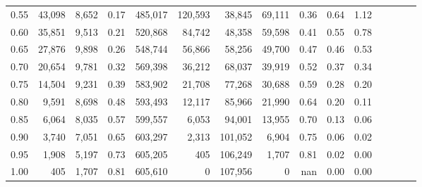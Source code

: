 \begin{tabular}{rrrcrrrrrrrrrrr}
0.55 &  43,098 &  8,652 &                                       0.17 &  485,017 &  120,593 &   38,845 &   69,111 &  0.36 &  0.64 &                         1.12 \\
0.60 &  35,851 &  9,513 &                                       0.21 &  520,868 &   84,742 &   48,358 &   59,598 &  0.41 &  0.55 &                         0.78 \\
0.65 &  27,876 &  9,898 &                                       0.26 &  548,744 &   56,866 &   58,256 &   49,700 &  0.47 &  0.46 &                         0.53 \\
0.70 &  20,654 &  9,781 &                                       0.32 &  569,398 &   36,212 &   68,037 &   39,919 &  0.52 &  0.37 &                         0.34 \\
0.75 &  14,504 &  9,231 &                                       0.39 &  583,902 &   21,708 &   77,268 &   30,688 &  0.59 &  0.28 &                         0.20 \\
0.80 &   9,591 &  8,698 &                                       0.48 &  593,493 &   12,117 &   85,966 &   21,990 &  0.64 &  0.20 &                         0.11 \\
0.85 &   6,064 &  8,035 &                                       0.57 &  599,557 &    6,053 &   94,001 &   13,955 &  0.70 &  0.13 &                         0.06 \\
0.90 &   3,740 &  7,051 &                                       0.65 &  603,297 &    2,313 &  101,052 &    6,904 &  0.75 &  0.06 &                         0.02 \\
0.95 &   1,908 &  5,197 &                                       0.73 &  605,205 &      405 &  106,249 &    1,707 &  0.81 &  0.02 &                         0.00 \\
1.00 &     405 &  1,707 &                                       0.81 &  605,610 &        0 &  107,956 &        0 &   nan &  0.00 &                         0.00 \\
\bottomrule
\end{tabular}
